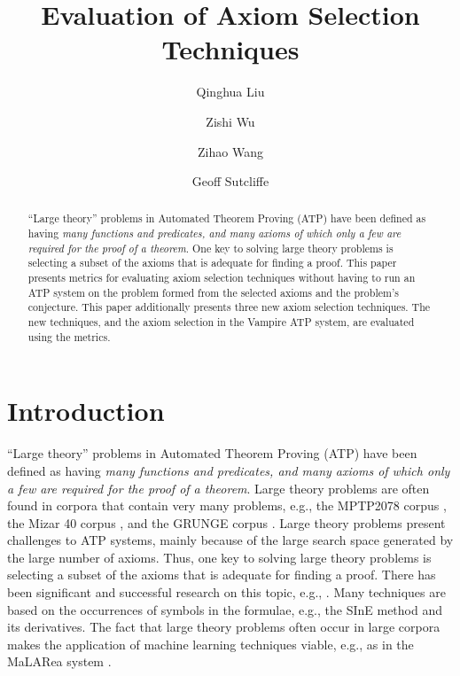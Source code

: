 \documentclass[EPiC]{easychair}
\title{Evaluation of Axiom Selection Techniques}
\author{
Qinghua Liu\inst{1}
 \and
Zishi Wu\inst{2}
 \and
Zihao Wang\inst{2}
 \and
Geoff Sutcliffe\inst{2}
}
\institute{
  Southwest Jiaotong University, China, \email{qhliu@my.swjtu.edu.cn}
\and
   University of Miami, USA, \email{zishi@cs.miami.edu,zxw526@miami.edu,geoff@cs.miami.edu}
 }
\begin{document}
\maketitle
\begin{abstract}
``Large theory'' problems in Automated Theorem Proving (ATP) have been
defined as having {\em many functions and predicates, and many axioms of
which only a few are required for the proof of a theorem}.
One key to solving large theory problems is selecting a subset of the axioms
that is adequate for finding a proof.
This paper presents metrics for evaluating axiom selection techniques
without having to run an ATP system on the problem formed from the selected
axioms and the problem's conjecture.
This paper additionally presents three new axiom selection techniques.
The new techniques, and the axiom selection in the Vampire ATP 
system, are evaluated using the metrics.
\end{abstract}
\section{Introduction}
\label{Introduction}

``Large theory'' problems in Automated Theorem Proving (ATP) have been 
defined \cite{Sut20-CASC} as having {\em many functions and predicates, and 
many axioms of which only a few are required for the proof of a theorem}.
Large theory problems are often found in corpora that contain very many
problems, e.g., the MPTP2078 corpus \cite{AH+14}, the Mizar 40 corpus
\cite{KU15-M40}, and the GRUNGE corpus \cite{BG+19}.
Large theory problems present challenges to ATP systems, mainly because of the
large search space generated by the large number of axioms.
Thus, one key to solving large theory problems is selecting a subset of the 
axioms that is adequate for finding a proof. 
There has been significant and successful research on this topic, e.g.,
\cite{PSZG04,SP07,MP09,KC+10,HV11,Kv+12,AH+14,GK15,PU18}.
Many techniques are based on the occurrences of symbols in the formulae,
e.g., the SInE method \cite{HV11} and its derivatives. 
The fact that large theory problems often occur in large corpora makes the
application of machine learning techniques \cite{KB14} viable, e.g., as 
in the MaLARea system \cite{US+08}.
\end{document}
